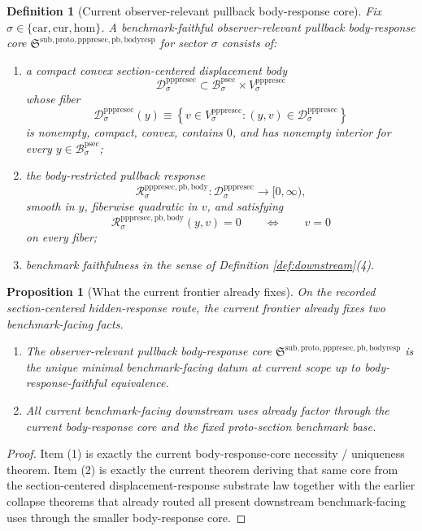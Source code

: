 \documentclass[11pt]{article}
\newcommand{\Car}{\mathrm{car}}
\newcommand{\Cur}{\mathrm{cur}}
\newcommand{\Hom}{\mathrm{hom}}
\newcommand{\ProtoSectionBody}[1]{\mathcal B_{#1}^{\mathrm{psec}}}
\newcommand{\PrePreProtoSectionVertical}[1]{V_{#1}^{\mathrm{pppresec}}}
\newcommand{\PrePreProtoSectionResidualBody}[1]{\mathcal D_{#1}^{\mathrm{pppresec}}}
\newcommand{\PrePreProtoSectionBodyResponse}[1]{\mathscr R_{#1}^{\mathrm{pppresec,pb,body}}}
\newcommand{\PullbackBodyResponseCore}{\mathfrak S^{\mathrm{sub,proto,pppresec,pb,bodyresp}}}
\newtheorem{definition}{Definition}
\newtheorem{proposition}{Proposition}
\begin{document}
\begin{definition}[Current observer-relevant pullback body-response core]
\label{def:bodyresp}
Fix \(\sigma\in\{\Car,\Cur,\Hom\}\). A \emph{benchmark-faithful observer-relevant pullback body-response core} \(\PullbackBodyResponseCore\) for sector \(\sigma\) consists of:
\begin{enumerate}
    \item a compact convex section-centered displacement body
    \[
    \PrePreProtoSectionResidualBody{\sigma}
    \subset
    \ProtoSectionBody{\sigma}\times\PrePreProtoSectionVertical{\sigma}
    \]
    whose fiber
    \[
    \PrePreProtoSectionResidualBody{\sigma}(y)
    \equiv
    \left\{
    v\in\PrePreProtoSectionVertical{\sigma}:(y,v)\in\PrePreProtoSectionResidualBody{\sigma}
    \right\}
    \]
    is nonempty, compact, convex, contains \(0\), and has nonempty interior for every \(y\in\ProtoSectionBody{\sigma}\);
    \item the body-restricted pullback response
    \[
    \PrePreProtoSectionBodyResponse{\sigma}:
    \PrePreProtoSectionResidualBody{\sigma}\to[0,\infty),
    \]
    smooth in \(y\), fiberwise quadratic in \(v\), and satisfying
    \[
    \PrePreProtoSectionBodyResponse{\sigma}(y,v)=0
    \qquad\Longleftrightarrow\qquad
    v=0
    \]
    on every fiber;
    \item benchmark faithfulness in the sense of Definition \ref{def:downstream}(4).
\end{enumerate}
\end{definition}

\begin{proposition}[What the current frontier already fixes]
\label{prop:frontier}
On the recorded section-centered hidden-response route, the current frontier already fixes two benchmark-facing facts.
\begin{enumerate}
    \item The observer-relevant pullback body-response core \(\PullbackBodyResponseCore\) is the unique minimal benchmark-facing datum at current scope up to body-response-faithful equivalence.
    \item All current benchmark-facing downstream uses already factor through the current body-response core and the fixed proto-section benchmark base.
\end{enumerate}
\end{proposition}

\begin{proof}
Item (1) is exactly the current body-response-core necessity / uniqueness theorem. Item (2) is exactly the current theorem deriving that same core from the section-centered displacement-response substrate law together with the earlier collapse theorems that already routed all present downstream benchmark-facing uses through the smaller body-response core.
\end{proof}
\end{document}

